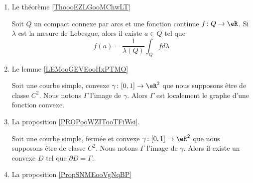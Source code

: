 \begin{enumerate}
\item

    Le théorème \ref{ThoooEZLGooMChwLT}

\begin{theorem}
    Soit \( Q\) un compact connexe par arcs et une fonction continue \( f\colon Q\to \eR\). Si \( \lambda\) est la mesure de Lebesgue, alors il existe \( a\in Q\) tel que
    \begin{equation}
        f(a)=\frac{1}{ \lambda(Q) }\int_Qfd\lambda
    \end{equation}
\end{theorem}

\item Le lemme \ref{LEMooGEVEooHxPTMO}


\begin{lemma}
    Soit une courbe simple, convexe \( \gamma\colon \mathopen[ 0 , 1 \mathclose]\to \eR^2\) que nous supposons être de classe \( C^2\). Nous notons \( \Gamma\) l'image de \( \gamma\). Alors \( \Gamma\) est localement le graphe d'une fonction convexe.
\end{lemma}

\item La proposition \ref{PROPooWZITooTFiWsi}.

\begin{proposition}
    Soit une courbe simple, fermée et convexe \( \gamma\colon \mathopen[ 0 , 1 \mathclose]\to \eR^2\) que nous supposons être de classe \( C^2\). Nous notons \( \Gamma\) l'image de \( \gamma\). Alors il existe un convexe \( D\) tel que \( \partial D=\Gamma\).
\end{proposition}

\item La proposition \ref{PropSNMEooVgNqBP}


\end{enumerate}
